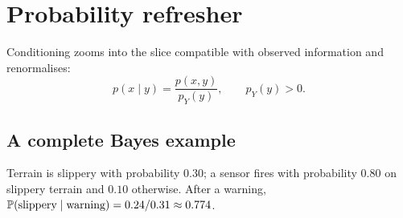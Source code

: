 \chapter{Probability refresher}
\label{app:probability}

Conditioning zooms into the slice compatible with observed information and renormalises:
\[
  p(x\mid y)=\frac{p(x,y)}{p_Y(y)},\qquad p_Y(y)>0.
\]

\section{A complete Bayes example}

Terrain is slippery with probability $0.30$; a sensor fires with probability $0.80$ on
slippery terrain and $0.10$ otherwise. After a warning,
$\mathbb{P}(\text{slippery}\mid\text{warning})=0.24/0.31\approx0.774$.

